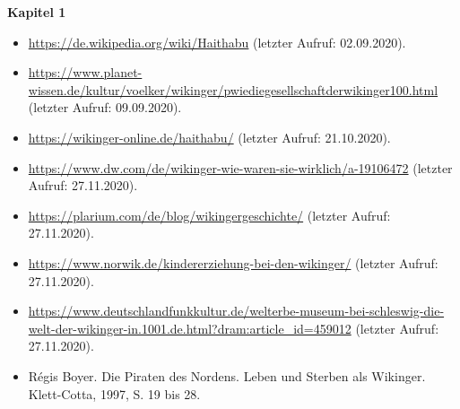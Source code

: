 \documentclass[12pt,a4paper,ngerman,openany]{book}
\begin{document}
\textbf{Kapitel 1}
\begin{itemize}
  \item \url{https://de.wikipedia.org/wiki/Haithabu} (letzter Aufruf: 02.09.2020).
  \item \url{https://www.planet-wissen.de/kultur/voelker/wikinger/pwiediegesellschaftderwikinger100.html} (letzter Aufruf: 09.09.2020).
  \item \url{https://wikinger-online.de/haithabu/} (letzter Aufruf: 21.10.2020).
  \item \url{https://www.dw.com/de/wikinger-wie-waren-sie-wirklich/a-19106472} (letzter Aufruf: 27.11.2020).
  \item \url{https://plarium.com/de/blog/wikingergeschichte/} (letzter Aufruf: 27.11.2020).
  \item \url{https://www.norwik.de/kindererziehung-bei-den-wikinger/} (letzter Aufruf: 27.11.2020).
  \item \url{https://www.deutschlandfunkkultur.de/welterbe-museum-bei-schleswig-die-welt-der-wikinger-in.1001.de.html?dram:article_id=459012} (letzter Aufruf: 27.11.2020).
  \item Régis Boyer. Die Piraten des Nordens. Leben und Sterben als Wikinger. Klett-Cotta, 1997, S. 19 bis 28.
\end{itemize}
\end{document}
